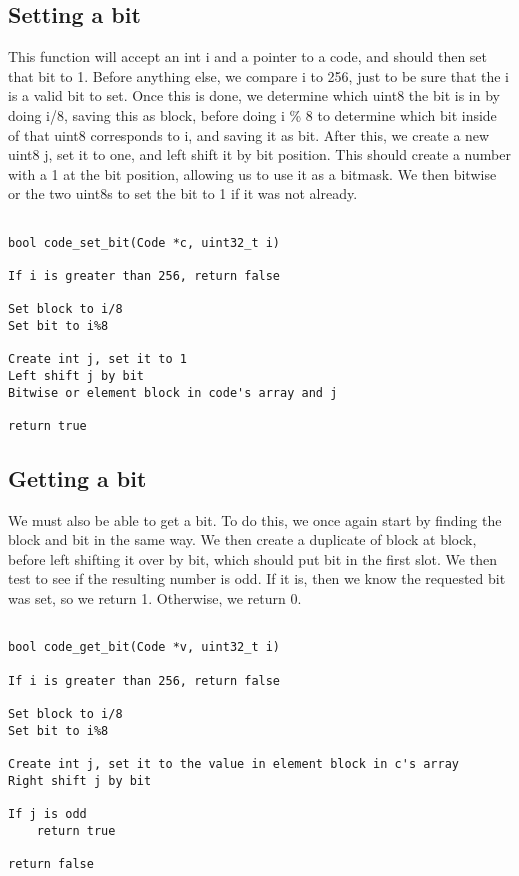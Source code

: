 \documentclass[11pt]{article}
\begin{document}
\subsection{Setting a bit}

This function will accept an int i and a pointer to a code, and should then set that bit to 1. Before anything else, we compare i to 256, just to be sure that the i is a valid bit to set. Once this is done, we determine which uint8 the bit is in by doing i/8, saving this as block, before doing i \% 8 to determine which bit inside of that uint8 corresponds to i, and saving it as bit. After this, we create a new uint8 j, set it to one, and left shift it by bit position. This should create a number with a 1 at the bit position, allowing us to use it as a bitmask. We then bitwise or the two uint8s to set the bit to 1 if it was not already.

\begin{verbatim}

bool code_set_bit(Code *c, uint32_t i)

If i is greater than 256, return false

Set block to i/8
Set bit to i%8

Create int j, set it to 1
Left shift j by bit
Bitwise or element block in code's array and j

return true

\end{verbatim}

\subsection{Getting a bit}

We must also be able to get a bit. To do this, we once again start by finding the block and bit in the same way. We then create a duplicate of block at block, before left shifting it over by bit, which should put bit in the first slot. We then test to see if the resulting number is odd. If it is, then we know the requested bit was set, so we return 1. Otherwise, we return 0.

\begin{verbatim}

bool code_get_bit(Code *v, uint32_t i)

If i is greater than 256, return false

Set block to i/8
Set bit to i%8

Create int j, set it to the value in element block in c's array
Right shift j by bit

If j is odd
    return true

return false

\end{verbatim}
\end{document}
